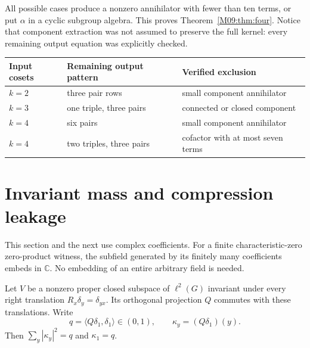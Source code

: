 \documentclass[11pt,a4paper,oneside]{report}
\theoremstyle{definition}
\theoremstyle{remark}
\newcommand{\C}{\mathbb C}
\begin{document}
All possible cases produce a nonzero annihilator with fewer than
ten terms, or put $\alpha$ in a cyclic subgroup algebra. This
proves Theorem~\ref{M09:thm:four}. Notice that component extraction
was not assumed to preserve the full kernel: every remaining
output equation was explicitly checked.

\begin{center}
\begin{tabular}{@{}lll@{}}
\toprule
Input cosets & Remaining output pattern & Verified exclusion\\
\midrule
$k=2$ & three pair rows & small component annihilator\\
$k=3$ & one triple, three pairs & connected or closed component\\
$k=4$ & six pairs & small component annihilator\\
$k=4$ & two triples, three pairs & cofactor with at most seven terms\\
\bottomrule
\end{tabular}
\end{center}

\section{Invariant mass and compression leakage}\label{M09:sec:mass}
This section and the next use complex coefficients. For a finite characteristic-zero zero-product witness, the subfield
generated by its finitely many coefficients embeds in $\C$. No embedding of an entire arbitrary field is needed.

Let $V$ be a nonzero proper closed subspace of $\ell^2(G)$
invariant under every right translation
$R_x\delta_y=\delta_{yx}$. Its orthogonal projection $Q$ commutes
with these translations. Write
\[
q=\langle Q\delta_1,\delta_1\rangle\in(0,1),\qquad
\kappa_y=(Q\delta_1)(y).
\]
Then $\sum_y|\kappa_y|^2=q$ and $\kappa_1=q$.
\end{document}
